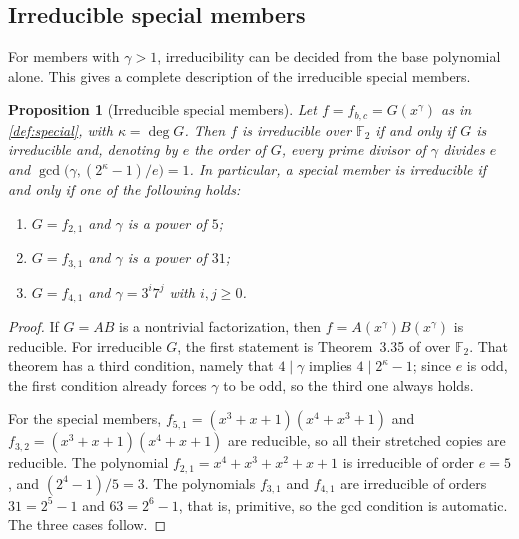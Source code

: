 \documentclass{ieeeaccess}
\theoremstyle{plain}
\newtheorem{proposition}[theorem]{Proposition}
\theoremstyle{definition}
\newcommand{\F}{\mathbb{F}}
\begin{document}
\subsection{Irreducible special members}\label{sec:specialmembers}

For members with $\gamma>1$, irreducibility can be decided from the base
polynomial alone. This gives a complete description of the irreducible special
members.

\begin{proposition}[Irreducible special members]\label{prop:specirr}
Let $f=f_{b,c}=G(x^\gamma)$ as in \cref{def:special}, with $\kappa=\deg G$. Then $f$
is irreducible over $\F_2$ if and only if $G$ is irreducible and, denoting by
$e$ the order of $G$, every prime divisor of $\gamma$ divides $e$ and
$\gcd\bigl(\gamma,(2^\kappa-1)/e\bigr)=1$. In particular, a special member is
irreducible if and only if one of the following holds:
\begin{enumerate}[label=(\roman*),itemsep=1pt]
  \item $G=f_{2,1}$ and $\gamma$ is a power of $5$;
  \item $G=f_{3,1}$ and $\gamma$ is a power of $31$;
  \item $G=f_{4,1}$ and $\gamma=3^i7^j$ with $i,j\ge0$.
\end{enumerate}
\end{proposition}

\begin{proof}
If $G=AB$ is a nontrivial factorization, then $f=A(x^\gamma)B(x^\gamma)$ is
reducible. For irreducible $G$, the first statement is Theorem~3.35 of
\cite{LidlNiederreiter1997} over $\F_2$. That theorem has a third condition,
namely that $4\mid\gamma$ implies $4\mid 2^\kappa-1$; since $e$ is odd, the first
condition already forces $\gamma$ to be odd, so the third one always holds.

For the special members, $f_{5,1}=(x^3+x+1)(x^4+x^3+1)$ and
$f_{3,2}=(x^3+x+1)(x^4+x+1)$ are reducible, so all their stretched copies are
reducible. The polynomial $f_{2,1}=x^4+x^3+x^2+x+1$ is irreducible of order
$e=5$, and $(2^4-1)/5=3$. The polynomials $f_{3,1}$ and $f_{4,1}$ are
irreducible of orders $31=2^5-1$ and $63=2^6-1$, that is, primitive, so the
gcd condition is automatic. The three cases follow.
\end{proof}
\end{document}
